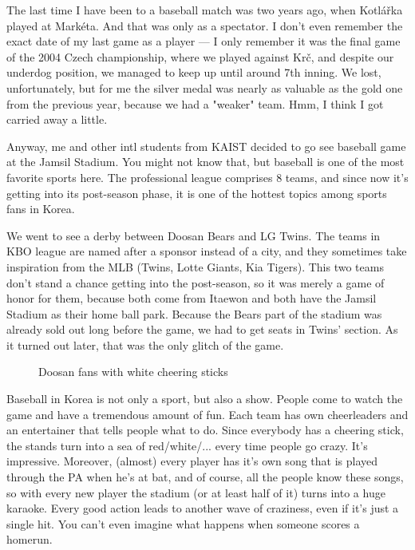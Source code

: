 \begin{post}
	\begin{content}
The last time I have been to a baseball match was two years ago, when Kotlářka played at Markéta. And that was only as a spectator. I don't even remember the exact date of my last game as a player --- I only remember it was the final game of the 2004 Czech championship, where we played against Krč, and despite our underdog position, we managed to keep up until around 7th inning. We lost, unfortunately, but for me the silver medal was nearly as valuable as the gold one from the previous year, because we had a "weaker" team. Hmm, I think I got carried away a little.

Anyway, me and other intl students from KAIST decided to go see baseball game at the Jamsil Stadium. You might not know that, but baseball is one of the most favorite sports here. The professional league comprises 8 teams, and since now it's getting into its post-season phase, it is one of the hottest topics among sports fans in Korea.

We went to see a derby between Doosan Bears and LG Twins. The teams in KBO league are named after a sponsor instead of a city, and they sometimes take inspiration from the MLB (Twins, Lotte Giants, Kia Tigers). This two teams don't stand a chance getting into the post-season, so it was merely a game of honor for them, because both come from Itaewon and both have the Jamsil Stadium as their home ball park. Because the Bears part of the stadium was already sold out long before the game, we had to get seats in Twins' section. As it turned out later, that was the only glitch of the game.

\begin{figure}
\centering
{}
\caption{Doosan fans with white cheering sticks}
\vspace{-24pt}
\end{figure}

Baseball in Korea is not only a sport, but also a show. People come to watch the game and have a tremendous amount of fun. Each team has own cheerleaders and an entertainer that tells people what to do. Since everybody has a cheering stick, the stands turn into a sea of red/white/... every time people go crazy. It's impressive. Moreover, (almost) every player has it's own song that is played through the PA when he's at bat, and of course, all the people know these songs, so with every new player the stadium (or at least half of it) turns into a huge karaoke. Every good action leads to another wave of craziness, even if it's just a single hit. You can't even imagine what happens when someone scores a homerun.


\end{content}
\end{post}
